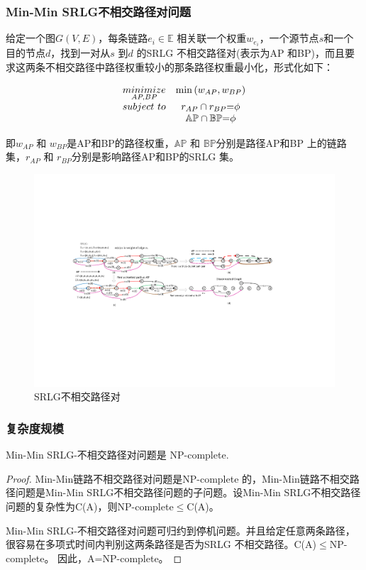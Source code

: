 \begin{frame}
\frametitle{Min-Min SRLG不相交路径对问题}
给定一个图$G(V,E)$，每条链路$e_i\in \mathbb{E}$ 相关联一个权重$w_{e_i}$，一个源节点$s$和一个目的节点$d$，找到一对从$s$ 到$d$ 的SRLG 不相交路径对(表示为AP 和BP)，而且要求这两条不相交路径中路径权重较小的那条路径权重最小化，形式化如下：

\begin{equation}
\begin{array}{*{20}{c}}
   {\mathop {minimize}\limits_{AP,BP} } & {\min \left( {{w_{AP}},{w_{BP}}} \right)}  \\
   {subject\ to} & {{r_{AP}} \cap {r_{BP}}{\rm{ = }}\phi }  \\
   {} & {\mathbb{AP} \cap \mathbb{BP}{\rm{ = }}\phi }  \\
\end{array}
\label{eq:problem definition}
\end{equation}

即${w_{AP}}$ 和 ${w_{BP}}$是AP和BP的路径权重，$\mathbb{AP}$ 和 $\mathbb{BP}$分别是路径AP和BP 上的链路集，${r_{AP}}$ 和 ${r_{BP}}$分别是影响路径AP和BP的SRLG 集。
\end{frame}

\begin{frame}
\begin{figure}[htbp]
  \centering
  \includegraphics[width=4.5in]{figures/CompositeGraph}
  \caption{SRLG不相交路径对}
  \label{fig:CompositeGraph}
\end{figure}
\end{frame}

\begin{frame}
\frametitle{复杂度规模}
\begin{theorem}
\label{le:lemma1}
    Min-Min SRLG-不相交路径对问题是 NP-complete.
\end{theorem}
\begin{proof}
Min-Min链路不相交路径对问题是NP-complete 的，Min-Min链路不相交路径问题是Min-Min SRLG不相交路径问题的子问题。设Min-Min SRLG不相交路径问题的复杂性为C(A)，则NP-complete$\leq$C(A)。

Min-Min SRLG-不相交路径对问题可归约到停机问题。并且给定任意两条路径，很容易在多项式时间内判别这两条路径是否为SRLG 不相交路径。C(A)$\leq$NP-complete。 因此，A=NP-complete。
\end{proof}
\end{frame}


